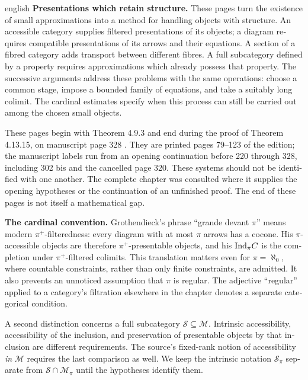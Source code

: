 \begin{otherlanguage}{english}
\begin{otherlanguage*}{english}
\noindent\textbf{Presentations which retain structure.}
These pages turn the existence of small approximations into a method for handling objects with structure. An accessible category supplies filtered presentations of its objects; a diagram requires compatible presentations of its arrows and their equations. A section of a fibred category adds transport between different fibres. A full subcategory defined by a property requires approximations which already possess that property. The successive arguments address these problems with the same operations: choose a common stage, impose a bounded family of equations, and take a suitably long colimit. The cardinal estimates specify when this process can still be carried out among the chosen small objects.

These pages begin with Theorem 4.9.3 and end during the proof of Theorem 4.13.15, on manuscript page 328 \citep{Grothendieck1990XVIII}. They are printed pages 79--123 of the edition; the manuscript labels run from an opening continuation before 220 through 328, including 302 bis and the cancelled page 320. These systems should not be identified with one another. The complete chapter was consulted where it supplies the opening hypotheses or the continuation of an unfinished proof. The end of these pages is not itself a mathematical gap.

\medskip\noindent\textbf{The cardinal convention.}
Grothendieck's phrase ``grande devant $\pi$'' means modern $\pi^+$-filteredness: every diagram with at most $\pi$ arrows has a cocone. His $\pi$-accessible objects are therefore $\pi^+$-presentable objects, and his $\mathrm{Ind}_\pi C$ is the completion under $\pi^+$-filtered colimits. This translation matters even for $\pi=\aleph_0$, where countable constraints, rather than only finite constraints, are admitted. It also prevents an unnoticed assumption that $\pi$ is regular. The adjective ``regular'' applied to a category's filtration elsewhere in the chapter denotes a separate categorical condition.

A second distinction concerns a full subcategory $\mathcal S\subseteq\mathcal M$. Intrinsic accessibility, accessibility of the inclusion, and preservation of presentable objects by that inclusion are different requirements. The source's fixed-rank notion of accessibility \emph{in} $\mathcal M$ requires the last comparison as well. We keep the intrinsic notation $\mathcal S_\pi$ separate from $\mathcal S\cap\mathcal M_\pi$ until the hypotheses identify them.


\end{otherlanguage*}
\end{otherlanguage}
